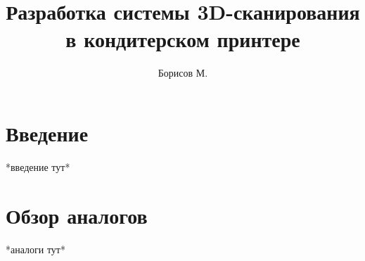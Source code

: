 \documentclass[a4paper, 12ppt]{article}
\author{Борисов М.}
\title{Разработка системы 3D-сканирования в кондитерском принтере}
\begin{document}
    \maketitle
    \section{Введение}
    *введение тут*
    \section{Обзор аналогов}
    *аналоги тут*
\end{document}
